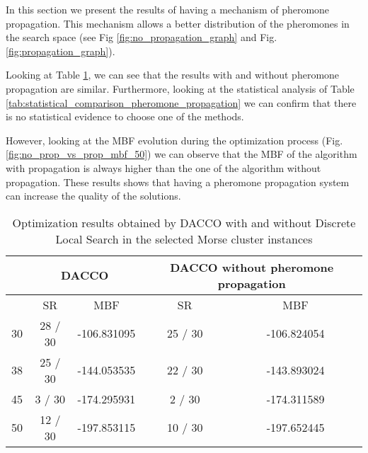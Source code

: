 		In this section we present the results of having a mechanism of pheromone propagation. This mechanism allows a better distribution of the pheromones in the search space (see Fig \ref{fig:no_propagation_graph} and Fig.\ref{fig:propagation_graph}).
		
		Looking at Table \ref{tab:pheromone_propagation_results}, we can see that the results with and without pheromone propagation are similar. Furthermore, looking at the statistical analysis of Table \ref{tab:statistical_comparison_pheromone_propagation} we can confirm that there is no statistical evidence to choose one of the methods. 
		
		However, looking at the MBF evolution during the optimization process (Fig. \ref{fig:no_prop_vs_prop_mbf_50}) we can observe that the MBF of the algorithm with propagation is always higher than the one of the algorithm without propagation. These results shows that having a pheromone propagation system can increase the quality of the solutions.
		
		
		\pagebreak
		
		\begin{table}[!htdp]
				\begin{center}
					\begin{tabular}{| c | c | c | c | c |}
						\hline
						~ & \multicolumn{2}{c|}{\textbf{DACCO}} & \multicolumn{2}{p{4cm}|}{\textbf{DACCO without pheromone propagation}} \\ \hline
						~ & SR & MBF & SR & MBF \\ \hline
						30 & 28 / 30 & -106.831095 & 25 / 30 & -106.824054 \\ \hline
						38 & 25 / 30 & -144.053535 & 22 / 30 & -143.893024 \\ \hline
						45 & 3 / 30 & -174.295931 & 2 / 30 & -174.311589 \\ \hline
						50 & 12 / 30 & -197.853115 & 10 / 30 & -197.652445 \\ \hline
					\end{tabular}
					\caption{Optimization results obtained by DACCO with and without Discrete Local Search in the selected Morse cluster instances}
					\label{tab:pheromone_propagation_results}
				\end{center}
		\end{table}
		
